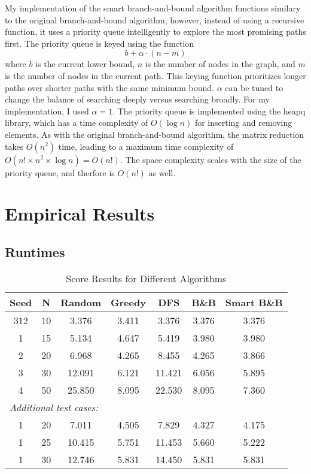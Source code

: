 \documentclass[12pt]{article}
\begin{document}
My implementation of the smart branch-and-bound algorithm functions similary to the 
original branch-and-bound algorithm, however, instead of using a recursive
function, it uses a priority queue intelligently to explore the most promising paths first.
The priority queue is keyed using the function
\[
    b + \alpha \cdot (n - m)
\]
where $b$ is the current lower bound, $n$ is the number of nodes in the graph, and $m$
is the number of nodes in the current path. This keying function prioritizes longer paths over
shorter paths with the same minimum bound. $\alpha$ can be tuned to change the balance of
searching deeply versus searching broadly. For my implementation, I used $\alpha = 1$. The priority
queue is implemented using the heapq library, which has a time complexity of $O(\log n)$ for
inserting and removing elements. As with the original branch-and-bound algorithm, the
matrix reduction takes $O(n^2)$ time, leading to a maximum time complexity of
$O(n! \times n^2 \times \log n) = O(n!)$. The space complexity scales with the size of the
priority queue, and therfore is $O(n!)$ as well. 

\section{Empirical Results}

\subsection{Runtimes}

\begin{table}[h!]
\centering
\begin{tabular}{ccccccc}
\toprule
Seed & N & Random & Greedy & DFS & B\&B & Smart B\&B \\
\midrule
312 & 10 & 3.376 & 3.411 & 3.376 & 3.376 & 3.376 \\
1   & 15 & 5.134 & 4.647 & 5.419 & 3.980 & 3.980 \\
2   & 20 & 6.968 & 4.265 & 8.455 & 4.265 & 3.866 \\
3   & 30 & 12.091 & 6.121 & 11.421 & 6.056 & 5.895 \\
4   & 50 & 25.850 & 8.095 & 22.530 & 8.095 & 7.360 \\
\midrule
\multicolumn{7}{l}{\textit{Additional test cases:}} \\
1   & 20  & 7.011 & 4.505 & 7.829 & 4.327 & 4.175 \\
1   & 25  & 10.415 & 5.751 & 11.453 & 5.660 & 5.222 \\
1   & 30  & 12.746 & 5.831 & 14.450 & 5.831 & 5.831 \\
\bottomrule
\end{tabular}
\caption{Score Results for Different Algorithms}
\label{tab:runtimes}
\end{table}
\end{document}
